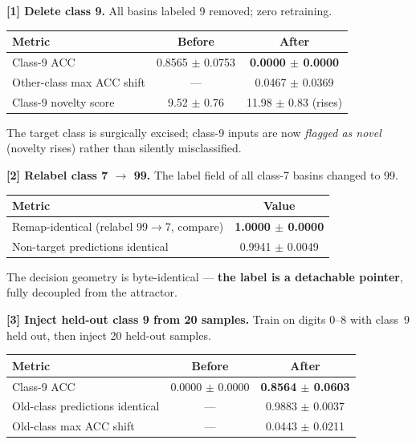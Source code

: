\documentclass[11pt,a4paper]{article}
\begin{document}
\textbf{[1] Delete class 9.} All basins labeled 9 removed; zero retraining.

\begin{table}[H]
\centering
\begin{tabular}{@{}lcc@{}}
\toprule
Metric & Before & After \\
\midrule
Class-9 ACC & 0.8565 $\pm$ 0.0753 & \textbf{0.0000 $\pm$ 0.0000} \\
Other-class max ACC shift & — & 0.0467 $\pm$ 0.0369 \\
Class-9 novelty score & 9.52 $\pm$ 0.76 & 11.98 $\pm$ 0.83 (rises) \\
\bottomrule
\end{tabular}
\end{table}

The target class is surgically excised; class-9 inputs are now \textit{flagged as novel} (novelty rises) rather than silently misclassified.

\medskip
\textbf{[2] Relabel class 7 $\to$ 99.} The label field of all class-7 basins changed to 99.

\begin{table}[H]
\centering
\begin{tabular}{@{}lc@{}}
\toprule
Metric & Value \\
\midrule
Remap-identical (relabel 99$\to$7, compare) & \textbf{1.0000 $\pm$ 0.0000} \\
Non-target predictions identical & 0.9941 $\pm$ 0.0049 \\
\bottomrule
\end{tabular}
\end{table}

The decision geometry is byte-identical — \textbf{the label is a detachable pointer}, fully decoupled from the attractor.

\medskip
\textbf{[3] Inject held-out class 9 from 20 samples.} Train on digits 0–8 with class~9 held out, then inject 20 held-out samples.

\begin{table}[H]
\centering
\begin{tabular}{@{}lcc@{}}
\toprule
Metric & Before & After \\
\midrule
Class-9 ACC & 0.0000 $\pm$ 0.0000 & \textbf{0.8564 $\pm$ 0.0603} \\
Old-class predictions identical & — & 0.9883 $\pm$ 0.0037 \\
Old-class max ACC shift & — & 0.0443 $\pm$ 0.0211 \\
\bottomrule
\end{tabular}
\end{table}
\end{document}
